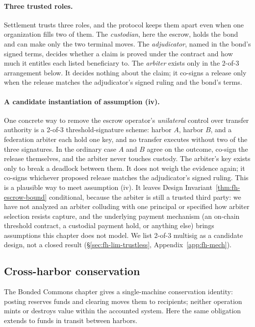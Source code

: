 \documentclass[11pt,a4paper]{article}
\theoremstyle{definition}
\theoremstyle{remark}
\begin{document}
\paragraph{Three trusted roles.} Settlement trusts three roles, and the protocol keeps them apart even when one organization fills two of them. The \emph{custodian}, here the escrow, holds the bond and can make only the two terminal moves. The \emph{adjudicator}, named in the bond's signed terms, decides whether a claim is proved under the contract and how much it entitles each listed beneficiary to. The \emph{arbiter} exists only in the 2-of-3 arrangement below. It decides nothing about the claim; it co-signs a release only when the release matches the adjudicator's signed ruling and the bond's terms.

\paragraph{A candidate instantiation of assumption (iv).} One concrete way to remove the escrow operator's \emph{unilateral} control over transfer authority is a 2-of-3 threshold-signature scheme: harbor $A$, harbor $B$, and a federation arbiter each hold one key, and no transfer executes without two of the three signatures. In the ordinary case $A$ and $B$ agree on the outcome, co-sign the release themselves, and the arbiter never touches custody. The arbiter's key exists only to break a deadlock between them. It does not weigh the evidence again; it co-signs whichever proposed release matches the adjudicator's signed ruling. This is a plausible way to meet assumption (iv). It leaves Design Invariant~\ref{thm:fh-escrow-bound} conditional, because the arbiter is still a trusted third party: we have not analyzed an arbiter colluding with one principal or specified how arbiter selection resists capture, and the underlying payment mechanism (an on-chain threshold contract, a custodial payment hold, or anything else) brings assumptions this chapter does not model. We list 2-of-3 multisig as a candidate design, not a closed result (\S\ref{sec:fh-lim-trustless}, Appendix~\ref{app:fh-mech}).

\subsection{Cross-harbor conservation}\label{sec:fh-cross-conservation}

The Bonded Commons chapter gives a single-machine conservation identity:
posting reserves funds and clearing moves them to recipients; neither operation
mints or destroys value within the accounted system. Here the same obligation
extends to funds in transit between harbors.
\end{document}
